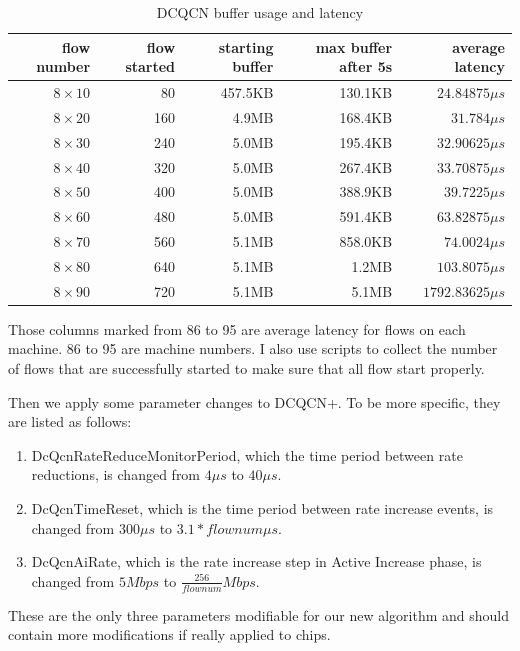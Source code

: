 \documentclass[12pt,a4paper]{article}
\begin{document}
\begin{table}[h!]
	\begin{center}
		\caption{DCQCN buffer usage and latency}
		\label{tab:default}
		\begin{tabular}{|r|r|r|r|r|}
			\hline
			flow number & flow started & starting buffer & max buffer after 5s & average latency\\
			\hline
			$8\times 10$ & 80 & 457.5KB & 130.1KB & $24.84875\mu s$\\
			\hline
			$8\times 20$ & 160 & 4.9MB & 168.4KB & $31.784\mu s$\\
			\hline
			$8\times 30$ & 240 & 5.0MB & 195.4KB & $32.90625\mu s$\\
			\hline
			$8\times 40$ & 320 & 5.0MB & 267.4KB & $33.70875\mu s$\\
			\hline
			$8\times 50$ & 400 & 5.0MB & 388.9KB & $39.7225\mu s$\\
			\hline
			$8\times 60$ & 480 & 5.0MB & 591.4KB & $63.82875\mu s$\\
			\hline
			$8\times 70$ & 560 & 5.1MB & 858.0KB & $74.0024\mu s$\\
			\hline
			$8\times 80$ & 640 & 5.1MB & 1.2MB & $103.8075\mu s$\\
			\hline
			$8\times 90$ & 720 & 5.1MB & 5.1MB & $1792.83625\mu s$\\
			\hline
		\end{tabular}
	\end{center}
\end{table}

Those columns marked from 86 to 95 are average latency for flows on each machine.
86 to 95 are machine numbers.
I also use scripts to collect the number of flows that are successfully started to make sure that all flow start properly.

Then we apply some parameter changes to DCQCN+. To be more specific, they are listed as follows:
\begin{enumerate}
	\item DcQcnRateReduceMonitorPeriod, which the time period between rate reductions, is changed from $4\mu s$ to $40\mu s$.
	\item DcQcnTimeReset, which is the time period between rate increase events, is changed from $300\mu s$ to $3.1*flownum \mu s$.
	\item DcQcnAiRate, which is the rate increase step in Active Increase phase, is changed from $5Mbps$ to $\frac{256}{flownum} Mbps$.
\end{enumerate}
These are the only three parameters modifiable for our new algorithm and should contain more modifications if really applied to chips.
\end{document}
